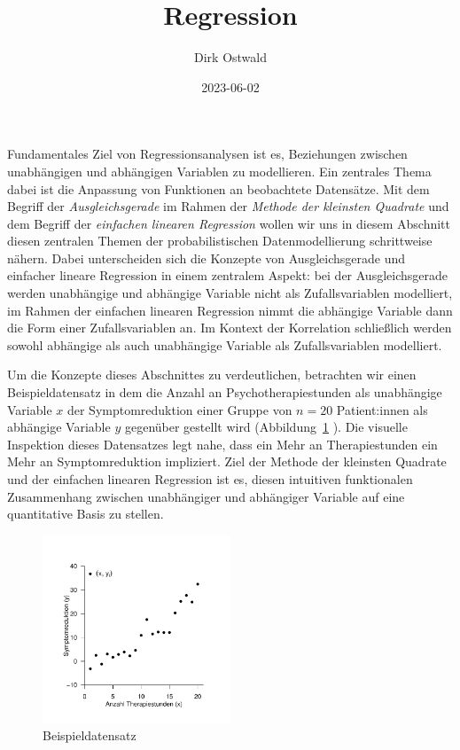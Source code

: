 \documentclass[
  letterpaper,
  DIV=11]{scrartcl}
\title{Regression}
\author{Dirk Ostwald}
\date{2023-06-02}
\theoremstyle{plain}
\theoremstyle{definition}
\theoremstyle{remark}
\begin{document}
\maketitle
\ifdefined\Shaded\renewenvironment{Shaded}{\begin{tcolorbox}[sharp corners, boxrule=0pt, frame hidden, enhanced, breakable, interior hidden, borderline west={3pt}{0pt}{shadecolor}]}{\end{tcolorbox}}\fi

Fundamentales Ziel von Regressionsanalysen ist es, Beziehungen zwischen
unabhängigen und abhängigen Variablen zu modellieren. Ein zentrales
Thema dabei ist die Anpassung von Funktionen an beobachtete Datensätze.
Mit dem Begriff der \emph{Ausgleichsgerade} im Rahmen der \emph{Methode
der kleinsten Quadrate} und dem Begriff der \emph{einfachen linearen
Regression} wollen wir uns in diesem Abschnitt diesen zentralen Themen
der probabilistischen Datenmodellierung schrittweise nähern. Dabei
unterscheiden sich die Konzepte von Ausgleichsgerade und einfacher
lineare Regression in einem zentralem Aspekt: bei der Ausgleichsgerade
werden unabhängige und abhängige Variable nicht als Zufallsvariablen
modelliert, im Rahmen der einfachen linearen Regression nimmt die
abhängige Variable dann die Form einer Zufallsvariablen an. Im Kontext
der Korrelation schließlich werden sowohl abhängige als auch unabhängige
Variable als Zufallsvariablen modelliert.

Um die Konzepte dieses Abschnittes zu verdeutlichen, betrachten wir
einen Beispieldatensatz in dem die Anzahl an Psychotherapiestunden als
unabhängige Variable \(x\) der Symptomreduktion einer Gruppe von
\(n = 20\) Patient:innen als abhängige Variable \(y\) gegenüber gestellt
wird (Abbildung~\ref{fig-beispieldatensatz} ). Die visuelle Inspektion
dieses Datensatzes legt nahe, dass ein Mehr an Therapiestunden ein Mehr
an Symptomreduktion impliziert. Ziel der Methode der kleinsten Quadrate
und der einfachen linearen Regression ist es, diesen intuitiven
funktionalen Zusammenhang zwischen unabhängiger und abhängiger Variable
auf eine quantitative Basis zu stellen.

\begin{figure}

{\centering \includegraphics[width=0.5\textwidth,height=\textheight]{./Abbildungen/reg_beispieldatensatz.pdf}

}

\caption{\label{fig-beispieldatensatz}Beispieldatensatz}

\end{figure}
\end{document}
